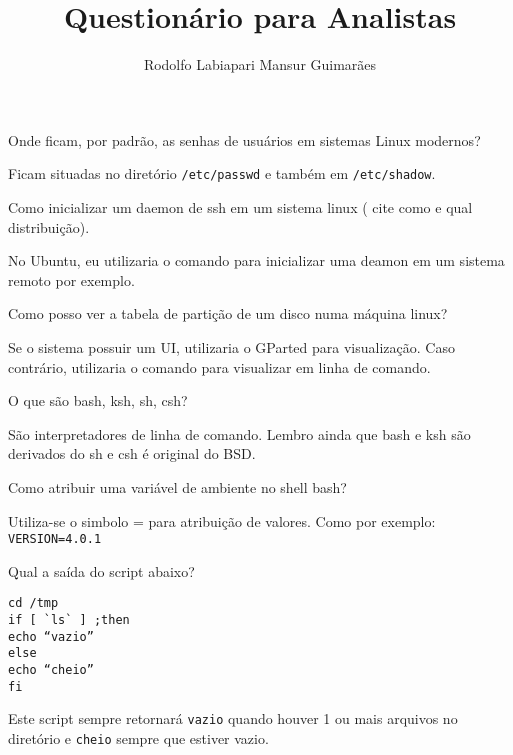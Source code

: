 \documentclass{ximera}
\title{Questionário para Analistas}
\author{Rodolfo Labiapari Mansur Guimarães}
\begin{document}
\begin{abstract}
\end{abstract}
\maketitle
\begin{example}
Onde ficam, por padrão, as senhas de usuários em sistemas Linux modernos?
\begin{explanation}
Ficam situadas no diretório \texttt{/etc/passwd} e também em \texttt{/etc/shadow}.
\end{explanation}
\end{example}


\begin{example}
Como inicializar um daemon de ssh em um sistema linux ( cite como e qual
distribuição).
\begin{explanation}
No Ubuntu, eu utilizaria o comando  para inicializar uma deamon em um sistema remoto por exemplo.
\end{explanation}
\end{example}


\begin{example}
Como posso ver a tabela de partição de um disco numa máquina linux?
\begin{explanation}
Se o sistema possuir um UI, utilizaria o GParted para visualização.
Caso contrário, utilizaria o comando  para visualizar em linha de comando.
\end{explanation}
\end{example}


\begin{example}
O que são bash, ksh, sh, csh?
\begin{explanation}
São interpretadores de linha de comando.
Lembro ainda que bash e ksh são derivados do sh e csh é original do BSD.
\end{explanation}
\end{example}


\begin{example}
Como atribuir uma variável de ambiente no shell bash?
\begin{explanation}
Utiliza-se o simbolo = para atribuição de valores. Como por exemplo:
\texttt{VERSION=4.0.1}
\end{explanation}
\end{example}


\begin{example}
Qual a saída do script abaixo?
\begin{verbatim}
cd /tmp
if [ `ls` ] ;then
echo “vazio”
else
echo “cheio”
fi
\end{verbatim}
\begin{explanation}
Este script sempre retornará \texttt{vazio} quando houver 1 ou mais arquivos no diretório e \texttt{cheio} sempre que estiver vazio.
\end{explanation}
\end{example}
\end{document}

